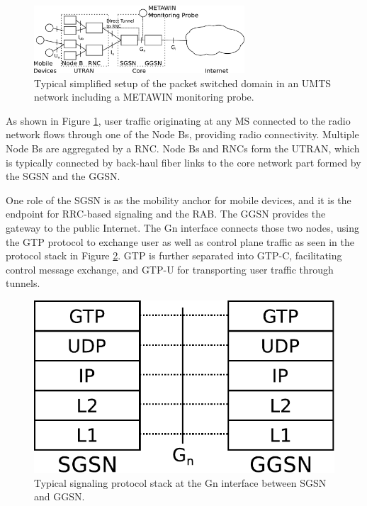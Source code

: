 \begin{figure}
\centering
\includegraphics[width=0.7\textwidth]{images/CONEXT2012/umts-network.pdf}
\caption{Typical simplified setup of the packet switched domain in an \acs{UMTS} network including a METAWIN monitoring probe.}
\label{fig:umtsnetwork-CONEXT}
\end{figure}



As shown in Figure \ref{fig:umtsnetwork-CONEXT}, user traffic originating at any \ac{MS} connected to the radio network flows through one of the Node Bs, providing radio connectivity. Multiple Node Bs are aggregated by a \ac{RNC}. Node Bs and \acp{RNC} form the \ac{UTRAN}, which is typically connected by back-haul fiber links to the core network part formed by the \ac{SGSN} and the \ac{GGSN}.

One role of the \ac{SGSN} is as the mobility anchor for mobile devices, and it is the endpoint for \ac{RRC}-based signaling and the \ac{RAB}. The \ac{GGSN} provides the gateway to the public Internet. The Gn interface connects those two nodes, using the \ac{GTP} protocol to exchange user as well as control plane traffic as seen in the protocol stack in Figure \ref{fig:signallingstack-CONEXT}. \ac{GTP} is further separated into GTP-C, facilitating control message exchange, and GTP-U for transporting user traffic through tunnels.


\begin{figure}
\centering
\includegraphics[width=0.6\columnwidth]{images/CONEXT2012/signalling-stack.pdf}
\caption{Typical signaling protocol stack at the Gn interface between \ac{SGSN} and \ac{GGSN}.}
\label{fig:signallingstack-CONEXT}
\end{figure}




